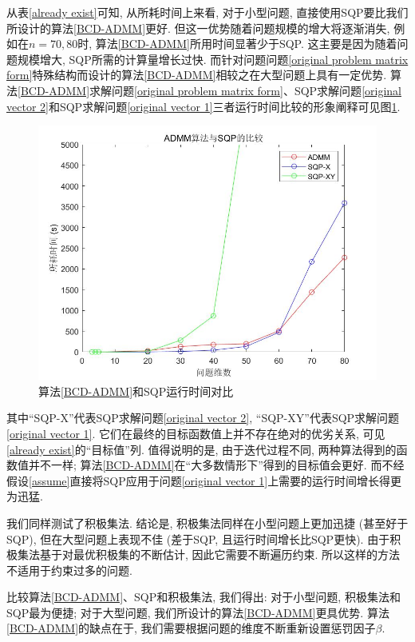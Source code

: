 \documentclass[UTF8,10.5pt,a4paper]{ctexart}
\theoremstyle{definition}
\theoremstyle{definition}
\begin{document}
\par 从表\ref{already exist}可知, 从所耗时间上来看, 对于小型问题, 直接使用SQP要比我们所设计的算法\ref{BCD-ADMM}更好. 但这一优势随着问题规模的增大将逐渐消失, 例如在$n=70,80$时, 算法\ref{BCD-ADMM}所用时间显著少于SQP. 这主要是因为随着问题规模增大, SQP所需的计算量增长过快. 而针对问题问题\eqref{original problem matrix form}特殊结构而设计的算法\ref{BCD-ADMM}相较之在大型问题上具有一定优势. 算法\ref{BCD-ADMM}求解问题\eqref{original problem matrix form}、SQP求解问题\eqref{original vector 2}和SQP求解问题\eqref{original vector 1}三者运行时间比较的形象阐释可见图\ref{time comparison}.
\begin{figure}[htbp]
	\renewcommand{\captionfont}{\small}
	\centering
	\includegraphics[width=.7\paperwidth]{already.jpg}
	\caption{算法\ref{BCD-ADMM}和SQP运行时间对比}
	\label{time comparison}
\end{figure}
其中``SQP-X''代表SQP求解问题\eqref{original vector 2}, ``SQP-XY''代表SQP求解问题\eqref{original vector 1}. 它们在最终的目标函数值上并不存在绝对的优劣关系, 可见\ref{already exist}的``目标值''列. 值得说明的是, 由于迭代过程不同, 两种算法得到的函数值并不一样; 算法\ref{BCD-ADMM}在``大多数情形下''得到的目标值会更好. 而不经假设\ref{assume}直接将SQP应用于问题\eqref{original vector 1}上需要的运行时间增长得更为迅猛. 
\par 我们同样测试了积极集法. 结论是, 积极集法同样在小型问题上更加迅捷 (甚至好于SQP), 但在大型问题上表现不佳 (差于SQP, 且运行时间增长比SQP更快). 由于积极集法基于对最优积极集的不断估计, 因此它需要不断遍历约束. 所以这样的方法不适用于约束过多的问题.
\par 比较算法\ref{BCD-ADMM}、SQP和积极集法, 我们得出: 对于小型问题, 积极集法和SQP最为便捷; 对于大型问题, 我们所设计的算法\ref{BCD-ADMM}更具优势. 算法\ref{BCD-ADMM}的缺点在于, 我们需要根据问题的维度不断重新设置惩罚因子$\beta$. 
\end{document}
